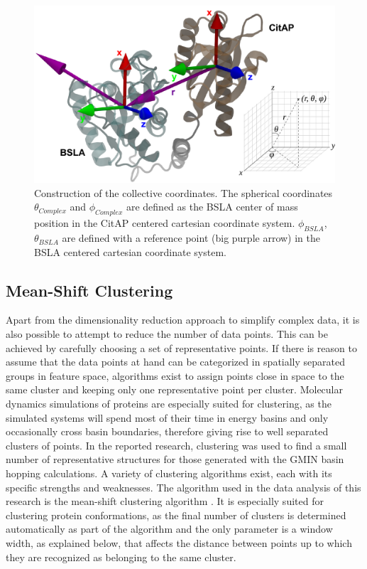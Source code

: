 \documentclass[english, a4paper, 12pt, titlepage, draft]{article}
\begin{document}
\begin{figure}
    \centering
    \includegraphics[width=1.0\textwidth]{figures/Collective_coords/collective_coords.pdf}
    \caption{Construction of the collective coordinates. The spherical coordinates $\theta_{Complex}$ and $\phi_{Complex}$ are defined as the BSLA center of mass position in the CitAP centered cartesian coordinate system.
    $\phi_{BSLA}$,$\theta_{BSLA}$ are defined with a reference point (big purple arrow) in the BSLA centered cartesian coordinate system.}
    \label{fig:collective_coords}
\end{figure}         
 


\subsection{Mean-Shift Clustering}
\label{sec:meanShift}

Apart from the dimensionality reduction approach to simplify complex data, it is also possible to attempt to reduce the number of data points.
This can be achieved by carefully choosing a set of representative points.
If there is reason to assume that the data points at hand can be categorized in spatially separated groups in feature space, algorithms exist to assign points close in space to the same cluster and keeping only one representative point per cluster.
Molecular dynamics simulations of proteins are especially suited for clustering, as the simulated systems will spend most of their time in energy basins and only occasionally cross basin boundaries, therefore giving rise to well separated clusters of points.
In the reported research, clustering was used to find a small number of representative structures for those generated with the GMIN basin hopping calculations.
A variety of clustering algorithms exist, each with its specific strengths and weaknesses.
The algorithm used in the data analysis of this research is the mean-shift clustering algorithm \cite{meanShift}.
It is especially suited for clustering protein conformations, as the final number of clusters is determined automatically as part of the algorithm and the only parameter is a window width, as explained below, that affects the distance between points up to which they are recognized as belonging to the same cluster.
\end{document}
